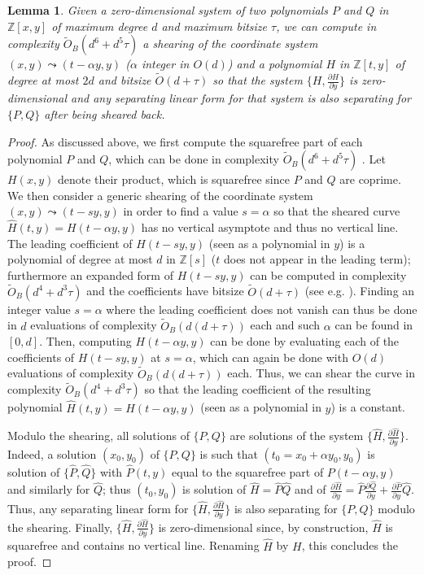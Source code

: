 \documentclass{sig-alternate}
\newtheorem{lemma}[theorem]{Lemma}
\newcommand {\Z}   {\mathbb Z}
\newcommand{\sO}{\ensuremath{\widetilde{{O}}}}
\newcommand{\sOB}{\ensuremath{\widetilde{{O}}_B}}
\newcommand{\blue}[1]{\color{blue}#1\color{black}\xspace}
\renewcommand{\blue}[1]{#1\xspace}
\begin{document}
\begin{lemma}
\label{lem:system2curve}
Given a zero-dimensional system of two polynomials $P$ and $Q$ in $\Z[x,y]$ of maximum degree $d$ and maximum
bitsize $\tau$, we can compute in complexity $\sOB(d^6+d^5\tau)$ a \blue{shearing} of the coordinate system
$(x,y)\leadsto(t-\alpha y,y)$ ($\alpha$ integer in $O(d)$) and a polynomial $H$ in $\Z[t,y]$ of degree at most $2d$ and bitsize $\sO(d+\tau)$  so
that the system $\{H,\frac{\partial H}{\partial y}\}$ is zero-dimensional and any separating linear
form for that system is also separating for $\{P,Q\}$ after being sheared back. 
\end{lemma}
\begin{proof}
As discussed above, we  first compute the squarefree part of \blue{each polynomial $P$ and $Q$}, which can be
done in complexity $\sOB(d^6+d^5\tau)$ \cite[Lemma 13]{sagraloff2013}. \blue{Let $H(x,y)$ denote
  their product, which is squarefree since $P$ and $Q$ are coprime.}
We then consider a generic \blue{shearing} of the
coordinate system $(x,y)\leadsto(t-s y,y)$ in order to find a value $s=\alpha$ so that the sheared
curve $\widehat{H}(t,y)=H(t-\alpha y,y)$ has no vertical asymptote \blue{ and thus no
vertical line.}
The leading coefficient of $H(t-s y,y)$ (seen as a polynomial in $y$) is a polynomial of degree at
most $d$ in $\Z[s]$ ($t$ does not appear in the leading
term); furthermore an expanded form of $H(t-s y,y)$  can  be computed in complexity
$\sOB(d^4+d^3\tau)$ and the coefficients have 
bitsize $\sO(d+\tau)$ (see e.g. \blue{\cite[Lemma 7]{bouzidiJSC2014a}}). Finding an integer value $s=\alpha$ where the leading coefficient does not vanish can thus be done in $d$
evaluations of complexity $\sOB(d(d+\tau))$ each \blue{\cite[Lemma 6]{bouzidiJSC2014a}} and such  $\alpha$ can be found in \blue{ $[0,d]$}. Then, computing $H(t-\alpha y,y)$   can be done by evaluating
each of the coefficients of $H(t-s y,y)$ at $s=\alpha$, which can again be done with $O(d)$
evaluations of  complexity $\sOB(d(d+\tau))$ each. 
Thus, we can shear the curve in complexity $\sOB(d^4+d^3\tau)$ so that the leading coefficient of the resulting polynomial $\widehat{H}(t,y)=H(t-\alpha y,y)$ (seen
as a polynomial in $y$) is a constant.


Modulo the \blue{shearing}, all solutions of $\{P,Q\}$ are solutions of the system $\{\widehat{H},\frac{\partial
\widehat{H}}{\partial y}\}$. Indeed, a solution $(x_0,y_0)$ of $\{P,Q\}$ is such that
$(t_0=x_0+\alpha y_0,  y_0)$ is solution of $\{\widehat{P},\widehat{Q}\}$ with
$\widehat{P}(t,y)$ equal to the squarefree part of $P(t-\alpha y,y)$ and similarly for
$\widehat{Q}$; thus $(t_0,  y_0)$ is solution of $\widehat{H}=\widehat{P}\widehat{Q}$ and of $\frac{\partial
\widehat{H}}{\partial y}=\widehat{P}\frac{\partial
\widehat{Q}}{\partial y} + \frac{\partial
\widehat{P}}{\partial y} \widehat{Q}$. Thus, any separating linear form for  $\{\widehat{H},\frac{\partial
\widehat{H}}{\partial y}\}$ is also separating for $\{P,Q\}$ modulo the \blue{shearing}. Finally, $\{\widehat{H},\frac{\partial
\widehat{H}}{\partial y}\}$ is zero-dimensional since, by construction,
$\widehat{H}$ is squarefree and contains no vertical
line.
Renaming $\widehat{H}$ by $H$, this concludes the proof.
\end{proof}
\end{document}
